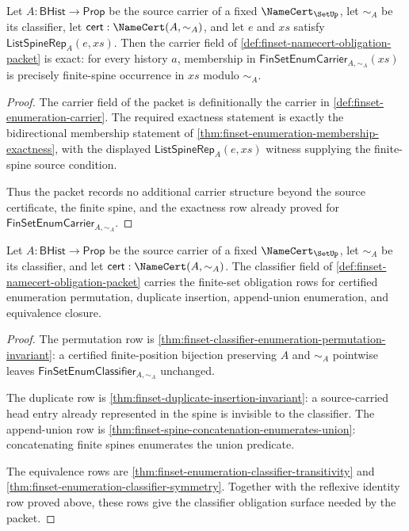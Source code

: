 \begin{theorem}
\label{thm:finset-carrier-obligation}
Let $A:\mathsf{BHist}\to\mathsf{Prop}$ be the source carrier of a fixed $\NameCert_{\SetUp}$, let $\sim_A$ be its classifier, let $\mathsf{cert}:\NameCert(A,\sim_A)$, and let $e$ and $xs$ satisfy $\mathsf{ListSpineRep}_A(e,xs)$. Then the carrier field of \autoref{def:finset-namecert-obligation-packet} is exact: for every history $a$, membership in $\mathsf{FinSetEnumCarrier}_{A,\sim_A}(xs)$ is precisely finite-spine occurrence in $xs$ modulo $\sim_A$.
\end{theorem}
\begin{proof}
The carrier field of the packet is definitionally the carrier in \autoref{def:finset-enumeration-carrier}. The required exactness statement is exactly the bidirectional membership statement of \autoref{thm:finset-enumeration-membership-exactness}, with the displayed $\mathsf{ListSpineRep}_A(e,xs)$ witness supplying the finite-spine source condition.

Thus the packet records no additional carrier structure beyond the source certificate, the finite spine, and the exactness row already proved for $\mathsf{FinSetEnumCarrier}_{A,\sim_A}$.
\end{proof}

\begin{theorem}
\label{thm:finset-classifier-obligation}
Let $A:\mathsf{BHist}\to\mathsf{Prop}$ be the source carrier of a fixed $\NameCert_{\SetUp}$, let $\sim_A$ be its classifier, and let $\mathsf{cert}:\NameCert(A,\sim_A)$. The classifier field of \autoref{def:finset-namecert-obligation-packet} carries the finite-set obligation rows for certified enumeration permutation, duplicate insertion, append-union enumeration, and equivalence closure.
\end{theorem}
\begin{proof}
The permutation row is \autoref{thm:finset-classifier-enumeration-permutation-invariant}: a certified finite-position bijection preserving $A$ and $\sim_A$ pointwise leaves $\mathsf{FinSetEnumClassifier}_{A,\sim_A}$ unchanged.

The duplicate row is \autoref{thm:finset-duplicate-insertion-invariant}: a source-carried head entry already represented in the spine is invisible to the classifier. The append-union row is \autoref{thm:finset-spine-concatenation-enumerates-union}: concatenating finite spines enumerates the union predicate.

The equivalence rows are \autoref{thm:finset-enumeration-classifier-transitivity} and \autoref{thm:finset-enumeration-classifier-symmetry}. Together with the reflexive identity row proved above, these rows give the classifier obligation surface needed by the packet.
\end{proof}


